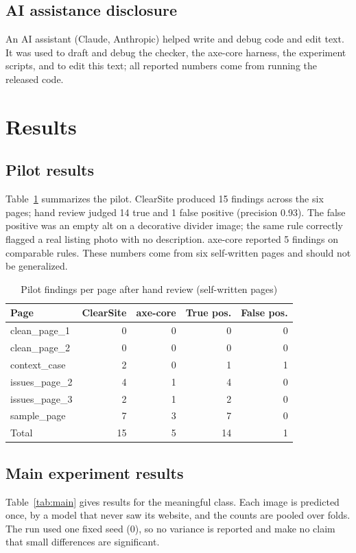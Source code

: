 \documentclass[sigconf,anonymous]{acmart}
\begin{document}
\subsection{AI assistance disclosure}
An AI assistant (Claude, Anthropic) helped write and debug code and edit text. It was used to draft and debug the checker, the axe-core harness, the experiment scripts, and to edit this text; all reported numbers come from running the released code.

\section{Results}
\subsection{Pilot results}
Table~\ref{tab:pilot} summarizes the pilot. ClearSite produced 15 findings across the six pages; hand review judged 14 true and 1 false positive (precision 0.93). The false positive was an empty alt on a decorative divider image; the same rule correctly flagged a real listing photo with no description. axe-core reported 5 findings on comparable rules. These numbers come from six self-written pages and should not be generalized.

\begin{table}[h]
\caption{Pilot findings per page after hand review (self-written pages)}
\label{tab:pilot}
\begin{tabular}{lrrrr}
\toprule
Page & ClearSite & axe-core & True pos. & False pos. \\
\midrule
clean\_page\_1 & 0 & 0 & 0 & 0 \\
clean\_page\_2 & 0 & 0 & 0 & 0 \\
context\_case & 2 & 0 & 1 & 1 \\
issues\_page\_2 & 4 & 1 & 4 & 0 \\
issues\_page\_3 & 2 & 1 & 2 & 0 \\
sample\_page & 7 & 3 & 7 & 0 \\
\midrule
Total & 15 & 5 & 14 & 1 \\
\bottomrule
\end{tabular}
\end{table}

\subsection{Main experiment results}
Table~\ref{tab:main} gives results for the meaningful class. Each image is predicted once, by a model that never saw its website, and the counts are pooled over folds. The run used one fixed seed (0), so no variance is reported and make no claim that small differences are significant.
\end{document}
